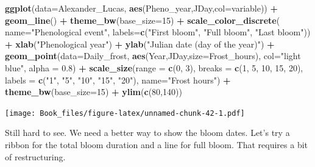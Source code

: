 \documentclass[
]{book}
\newenvironment{Shaded}{\begin{snugshade}}{\end{snugshade}}
\newcommand{\DataTypeTok}[1]{\textcolor[rgb]{0.13,0.29,0.53}{#1}}
\newcommand{\DecValTok}[1]{\textcolor[rgb]{0.00,0.00,0.81}{#1}}
\newcommand{\FloatTok}[1]{\textcolor[rgb]{0.00,0.00,0.81}{#1}}
\newcommand{\KeywordTok}[1]{\textcolor[rgb]{0.13,0.29,0.53}{\textbf{#1}}}
\newcommand{\NormalTok}[1]{#1}
\newcommand{\OperatorTok}[1]{\textcolor[rgb]{0.81,0.36,0.00}{\textbf{#1}}}
\newcommand{\StringTok}[1]{\textcolor[rgb]{0.31,0.60,0.02}{#1}}
\begin{document}
\begin{Shaded}
\begin{Highlighting}[]
\KeywordTok{ggplot}\NormalTok{(}\DataTypeTok{data=}\NormalTok{Alexander_Lucas,}
       \KeywordTok{aes}\NormalTok{(Pheno_year,JDay,}\DataTypeTok{col=}\NormalTok{variable)) }\OperatorTok{+}
\StringTok{  }\KeywordTok{geom_line}\NormalTok{() }\OperatorTok{+}
\StringTok{  }\KeywordTok{theme_bw}\NormalTok{(}\DataTypeTok{base_size=}\DecValTok{15}\NormalTok{) }\OperatorTok{+}
\StringTok{  }\KeywordTok{scale_color_discrete}\NormalTok{(}
    \DataTypeTok{name=}\StringTok{"Phenological event"}\NormalTok{,}
    \DataTypeTok{labels=}\KeywordTok{c}\NormalTok{(}\StringTok{"First bloom"}\NormalTok{, }\StringTok{"Full bloom"}\NormalTok{, }\StringTok{"Last bloom"}\NormalTok{)) }\OperatorTok{+}
\StringTok{  }\KeywordTok{xlab}\NormalTok{(}\StringTok{"Phenological year"}\NormalTok{) }\OperatorTok{+}
\StringTok{  }\KeywordTok{ylab}\NormalTok{(}\StringTok{"Julian date (day of the year)"}\NormalTok{) }\OperatorTok{+}
\StringTok{  }\KeywordTok{geom_point}\NormalTok{(}\DataTypeTok{data=}\NormalTok{Daily_frost,}
             \KeywordTok{aes}\NormalTok{(Year,JDay,}\DataTypeTok{size=}\NormalTok{Frost_hours),}
             \DataTypeTok{col=}\StringTok{"light blue"}\NormalTok{,}
             \DataTypeTok{alpha =} \FloatTok{0.8}\NormalTok{) }\OperatorTok{+}\StringTok{ }
\StringTok{  }\KeywordTok{scale_size}\NormalTok{(}\DataTypeTok{range =} \KeywordTok{c}\NormalTok{(}\DecValTok{0}\NormalTok{, }\DecValTok{3}\NormalTok{),}
             \DataTypeTok{breaks =} \KeywordTok{c}\NormalTok{(}\DecValTok{1}\NormalTok{, }\DecValTok{5}\NormalTok{, }\DecValTok{10}\NormalTok{, }\DecValTok{15}\NormalTok{, }\DecValTok{20}\NormalTok{),}
             \DataTypeTok{labels =} \KeywordTok{c}\NormalTok{(}\StringTok{"1"}\NormalTok{, }\StringTok{"5"}\NormalTok{, }\StringTok{"10"}\NormalTok{, }\StringTok{"15"}\NormalTok{, }\StringTok{"20"}\NormalTok{),}
             \DataTypeTok{name=}\StringTok{"Frost hours"}\NormalTok{) }\OperatorTok{+}
\StringTok{  }\KeywordTok{theme_bw}\NormalTok{(}\DataTypeTok{base_size=}\DecValTok{15}\NormalTok{) }\OperatorTok{+}
\StringTok{  }\KeywordTok{ylim}\NormalTok{(}\KeywordTok{c}\NormalTok{(}\DecValTok{80}\NormalTok{,}\DecValTok{140}\NormalTok{))}
\end{Highlighting}
\end{Shaded}

\texttt{[image: Book\_files/figure-latex/unnamed-chunk-42-1.pdf]}

Still hard to see. We need a better way to show the bloom dates. Let's try a ribbon for the total bloom duration and a line for full bloom. That requires a bit of restructuring.
\end{document}
